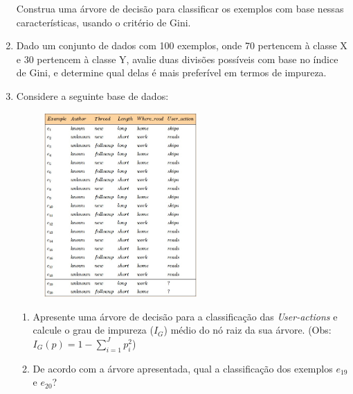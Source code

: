 \documentclass{article}
\begin{document}
\begin{enumerate}
   Construa uma árvore de decisão para classificar os exemplos com base nessas características, usando o critério de Gini.

   \item Dado um conjunto de dados com 100 exemplos, onde 70 pertencem à classe X e 30 pertencem à classe Y, avalie duas divisões possíveis com base no índice de Gini, e determine qual delas é mais preferível em termos de impureza.

   \item Considere a seguinte base de dados:
    
   \begin{figure}[!ht]
        \centering
        \includegraphics[width=0.55\textwidth]{abc.jpg}
   \end{figure}


       \begin{enumerate}
       
       \item Apresente uma árvore de decisão para a classificação das \textit{User-actions} e calcule o grau de impureza ($I_G$) médio do nó raiz da sua árvore. (Obs: $I_G(p) = 1 - \sum_{i=1}^{J}p_i^2$)
           
       \item De acordo com a árvore apresentada, qual a classificação dos exemplos $e_{19}$ e $e_{20}$?  
       
       \end{enumerate}

    \end{enumerate}

    
\end{document}

